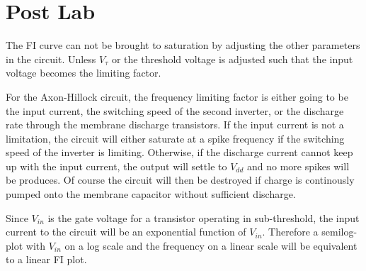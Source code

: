 

\newcommand{\reffig}[1]{Fig.~\ref{#1}}



\newpage
\section{Post Lab}
The FI curve can not be brought to saturation by adjusting the other parameters in the circuit. Unless \(V_\tau\) or the threshold voltage is
adjusted such that the input voltage becomes the limiting factor.

For the Axon-Hillock circuit, the frequency limiting factor is either going to be the input current, the switching speed of the second inverter, or
the discharge rate through the membrane discharge transistors. If the input current is not a limitation, the circuit will either saturate at 
a spike frequency if the switching speed of the inverter is limiting. Otherwise, if the discharge current cannot keep up with the input current,
the output will settle to \(V_{dd}\) and no more spikes will be produces. Of course the circuit will then be destroyed if charge is continously pumped
onto the membrane capacitor without sufficient discharge.

Since \(V_{in}\) is the gate voltage for a transistor operating in sub-threshold, the input current to the circuit will be an exponential
function of \(V_{in}\). Therefore a semilog-plot with \(V_{in}\) on a log scale and the frequency on a linear scale will be equivalent to
a linear FI plot.


